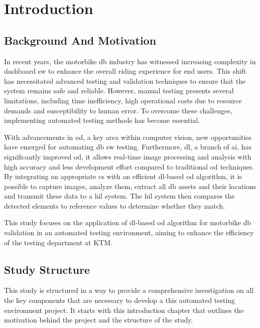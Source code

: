 \chapter{Introduction}

\section{Background And Motivation}
In recent years, the motorbike \gls{db} industry has witnessed increasing complexity in dashboard \gls{sw} to enhance the overall riding experience for end users. This shift has necessitated advanced testing and validation techniques to ensure that the system remains safe and reliable. However, manual testing presents several limitations, including time inefficiency, high operational costs due to resource demands and susceptibility to human error. To overcome these challenges, implementing automated testing methods has become essential.

With advancements in \gls{od}, a key area within computer vision, new opportunities have emerged for automating \gls{db} \gls{sw} testing. Furthermore, \gls{dl}, a branch of \gls{ai}, has significantly improved \gls{od}, it allows real-time image processing and analysis with high accuracy and less development effort compared to traditional \gls{od} techniques. By integrating an appropriate \gls{cs} with an efficient \gls{dl}-based \gls{od} algorithm, it is possible to capture images, analyze them, extract all \gls{db} assets and their locations and transmit these data to a \gls{hil} system. The \gls{hil} system then compares the detected elements to reference values to determine whether they match.

This study focuses on the application of \gls{dl}-based \gls{od} algorithm for motorbike \gls{db} validation in an automated testing environment, aiming to enhance the efficiency of the testing department at KTM.

\section{Study Structure}
This study is structured in a way to provide a comprehensive investigation on all the key components that are necessary to develop a this automated testing environment project. It starts with this introduction chapter that outlines the motivation behind the project and the structure of the study.

